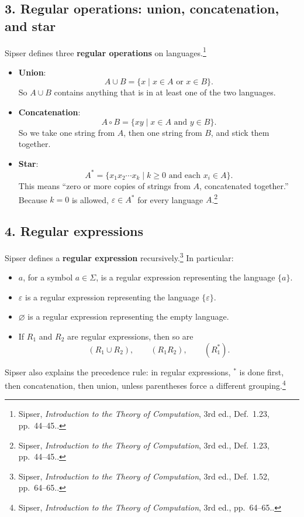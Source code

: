 \documentclass[12pt]{article}
\newcommand{\sipser}[1]{\footnote{Sipser, \emph{Introduction to the Theory of Computation}, 3rd ed., #1.}}
\begin{document}
\subsection*{3. Regular operations: union, concatenation, and star}

Sipser defines three \textbf{regular operations} on languages.\sipser{Def.~1.23, pp.~44--45.}

\begin{itemize}[itemsep=0.4em]
    \item \textbf{Union}:
    \[
    A\cup B=\{x\mid x\in A \text{ or } x\in B\}.
    \]
    So \(A\cup B\) contains anything that is in at least one of the two languages.

    \item \textbf{Concatenation}:
    \[
    A\circ B=\{xy\mid x\in A \text{ and } y\in B\}.
    \]
    So we take one string from \(A\), then one string from \(B\), and stick them together.

    \item \textbf{Star}:
    \[
    A^*=\{x_1x_2\cdots x_k\mid k\ge 0 \text{ and each } x_i\in A\}.
    \]
    This means ``zero or more copies of strings from \(A\), concatenated together.'' Because \(k=0\) is allowed, \(\varepsilon\in A^*\) for every language \(A\).\sipser{Def.~1.23, pp.~44--45.}
\end{itemize}

\subsection*{4. Regular expressions}

Sipser defines a \textbf{regular expression} recursively.\sipser{Def.~1.52, pp.~64--65.} In particular:

\begin{itemize}[itemsep=0.4em]
    \item \(a\), for a symbol \(a\in\Sigma\), is a regular expression representing the language \(\{a\}\).
    \item \(\varepsilon\) is a regular expression representing the language \(\{\varepsilon\}\).
    \item \(\varnothing\) is a regular expression representing the empty language.
    \item If \(R_1\) and \(R_2\) are regular expressions, then so are
    \[
    (R_1\cup R_2),\qquad (R_1R_2),\qquad (R_1^*).
    \]
\end{itemize}

Sipser also explains the precedence rule: in regular expressions, \(^*\) is done first, then concatenation, then union, unless parentheses force a different grouping.\sipser{pp.~64--65.}
\end{document}
